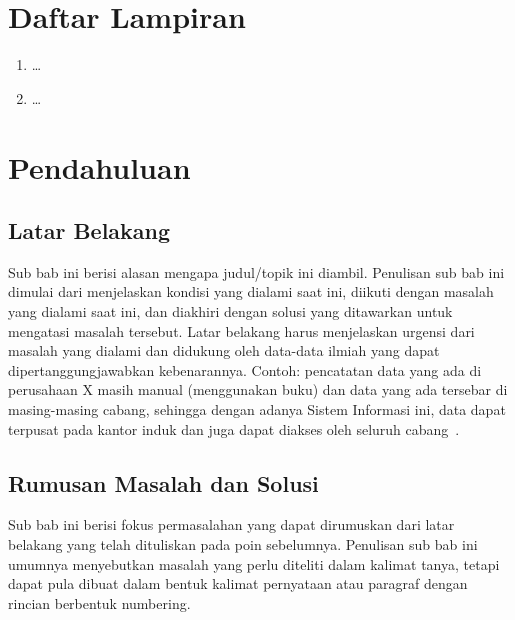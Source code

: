 \documentclass[a4paper,11pt,oneside]{report}
\begin{document}
\tableofcontents
\listoffigures
\listoftables

\chapter*{Daftar Lampiran}
\begin{enumerate}[label=Lampiran \arabic*.,leftmargin=*]
    \item \ldots
    \item \ldots
\end{enumerate}

\clearpage
{}
\setcounter{page}{1}
\chapter{Pendahuluan}

\section{Latar Belakang}
Sub bab ini berisi alasan mengapa judul/topik ini diambil. Penulisan sub bab
ini dimulai dari menjelaskan kondisi yang dialami saat ini, diikuti dengan
masalah yang dialami saat ini, dan diakhiri dengan solusi yang ditawarkan untuk
mengatasi masalah tersebut. Latar belakang harus menjelaskan urgensi dari
masalah yang dialami dan didukung oleh data-data ilmiah yang dapat
dipertanggungjawabkan kebenarannya. Contoh: pencatatan data yang ada di
perusahaan X masih manual (menggunakan buku) dan data yang ada tersebar di
masing-masing cabang, sehingga dengan adanya Sistem Informasi ini, data dapat
terpusat pada kantor induk dan juga dapat diakses oleh seluruh cabang~\cite{ref1}.

\section{Rumusan Masalah dan Solusi}
Sub bab ini berisi fokus permasalahan yang dapat dirumuskan dari latar belakang
yang telah dituliskan pada poin sebelumnya. Penulisan sub bab ini umumnya
menyebutkan masalah yang perlu diteliti dalam kalimat tanya, tetapi dapat pula
dibuat dalam bentuk kalimat pernyataan atau paragraf dengan rincian berbentuk
numbering.
\end{document}
